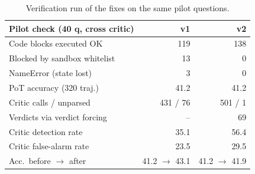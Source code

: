 \begin{table}[t]
\centering
\footnotesize
\caption{Verification run of the fixes on the same pilot questions.}
\label{tab:fixes}
\setlength{\tabcolsep}{3.5pt}
\begin{tabular}{lrr}
\toprule
Pilot check (40 q, cross critic) & v1 & v2 \\
\midrule
Code blocks executed OK & 119 & 138 \\
Blocked by sandbox whitelist & 13 & 0 \\
NameError (state lost) & 3 & 0 \\
PoT accuracy (320 traj.) & 41.2 & 41.2 \\
Critic calls / unparsed & 431 / 76 & 501 / 1 \\
Verdicts via verdict forcing & -- & 69 \\
Critic detection rate & 35.1 & 56.4 \\
Critic false-alarm rate & 23.5 & 29.5 \\
Acc.\ before $\to$ after & 41.2 $\to$ 43.1 & 41.2 $\to$ 41.9 \\
\bottomrule
\end{tabular}
\end{table}
